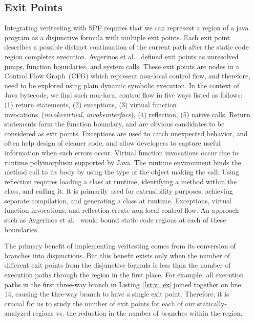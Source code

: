 \subsection{Exit Points}
%
Integrating veritesting with SPF requires that we can represent a region of a java program as a disjunctive formula with multiple exit points.  Each exit point describes a possible distinct continuation of the current path after the static code region completes execution.  Avgerinos et al.~\cite{veritesting} defined exit points as unresolved jumps, function boundaries, and system calls.
%
These exit points are nodes in a Control Flow Graph~(CFG) which represent non-local control flow, and therefore, need to be explored using plain dynamic symbolic execution.
%
In the context of Java bytecode, we find such non-local control flow in five ways listed as follows: (1) return statements, (2) exceptions, (3) virtual function invocations~(\textit{invokevirtual}, \textit{invokeinterface}), (4) reflection, (5) native calls.
%
Return statements form the function boundary, and are obvious candidates to be considered as exit points.
%
Exceptions are used to catch unexpected behavior, and often help design of cleaner code, and allow developers to capture useful information when such errors occur.
%
Virtual function invocations occur due to runtime polymorphism supported by Java.
%
The runtime environment binds the method call to its body by using the type of the object making the call.
%
Using reflection requires loading a class at runtime, identifying a method within the class, and calling it.
%
It is primarily used for extensibility purposes, achieving separate compilation, and generating a class at runtime.
%
Exceptions, virtual function invocations, and reflection create non-local control flow.
%
An approach such as Avgerinos et al.~\cite{veritesting} would bound static code regions at each of these boundaries.


%
The primary benefit of implementing veritesting comes from its conversion of branches into disjunctions.
%
But this benefit exists only when the number of different exit points from the disjunctive formula is less than the number of execution paths through the region in the first place.
%
For example, all execution paths in the first three-way branch in Listing~\ref{lst:v_ex} joined together on line 14, causing the thre-way branch to have a single exit point.
%
Therefore, it is crucial for us to study the number of exit points for each of our statically-analyzed regions vs. the reduction in the number of branches within the region.
%
%
%

